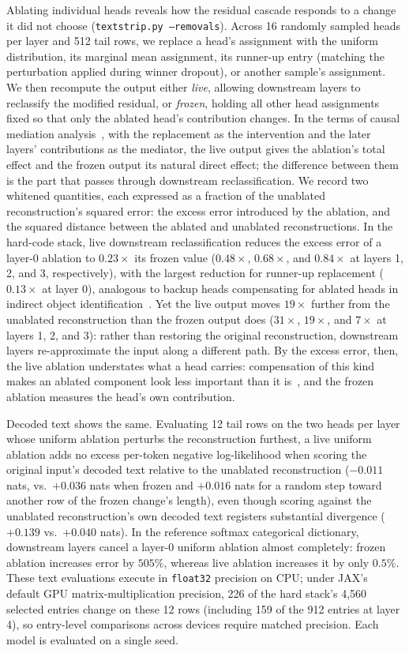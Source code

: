 Ablating individual heads reveals how the residual cascade responds to a
change it did not choose (\texttt{textstrip.py --removals}). Across 16
randomly sampled heads per layer and 512 tail rows, we replace a head's
assignment with the uniform distribution, its marginal mean assignment,
its runner-up entry (matching the perturbation applied during winner
dropout), or another sample's assignment. We then recompute the output
either \emph{live}, allowing downstream layers to reclassify the modified
residual, or \emph{frozen}, holding all other head assignments fixed so
that only the ablated head's contribution changes. In the terms of causal
mediation analysis~\cite[Sec.~3.2]{vig2020}, with the replacement as the
intervention and the later layers' contributions as the mediator, the live
output gives the ablation's total effect and the frozen output its natural
direct effect; the difference between them is the part that passes through
downstream reclassification. We record two whitened
quantities, each expressed as a fraction of the unablated
reconstruction's squared error: the excess error introduced by the
ablation, and the squared distance between the ablated and unablated
reconstructions. In the hard-code stack, live downstream reclassification
reduces the excess error of a layer-0 ablation to $0.23\times$ its frozen
value ($0.48\times$, $0.68\times$, and $0.84\times$ at layers 1, 2, and
3, respectively), with the largest reduction for runner-up replacement
($0.13\times$ at layer 0), analogous to backup heads compensating for
ablated heads in indirect object identification~\cite{wang2023ioi}. Yet
the live output moves $19\times$ further from the unablated
reconstruction than the frozen output does ($31\times$, $19\times$, and
$7\times$ at layers 1, 2, and 3): rather than restoring the original
reconstruction, downstream layers re-approximate the input along a
different path. By the excess error, then, the live ablation understates
what a head carries: compensation of this kind makes an ablated component
look less important than it is~\cite[Sec.~3.2]{heimersheim2024}, and the
frozen ablation measures the head's own contribution.

Decoded text shows the same. Evaluating 12 tail rows on the
two heads per layer whose uniform ablation perturbs the reconstruction
furthest, a live uniform ablation adds no excess per-token negative
log-likelihood when scoring the original input's decoded text relative to
the unablated reconstruction ($-0.011$ nats, vs.\ $+0.036$ nats when
frozen and $+0.016$ nats for a random step toward another
row of the frozen change's length), even though scoring against the unablated reconstruction's own
decoded text registers substantial divergence ($+0.139$ vs.\ $+0.040$
nats). In the reference softmax categorical dictionary, downstream layers
cancel a layer-0 uniform ablation almost completely: frozen ablation increases
error by $505\%$, whereas live ablation increases it by only $0.5\%$.
These text evaluations execute in \texttt{float32} precision on CPU;
under JAX's default GPU matrix-multiplication precision, 226 of the hard
stack's 4{,}560 selected entries change on these 12 rows (including 159
of the 912 entries at layer 4), so entry-level comparisons across devices
require matched precision. Each model is evaluated on a single seed.

